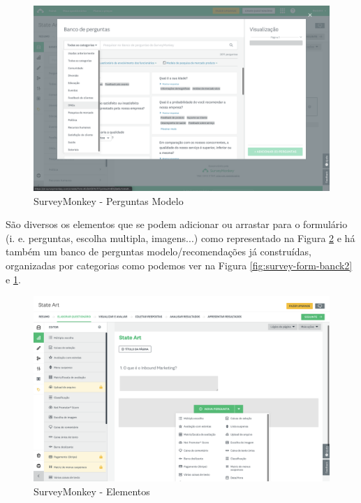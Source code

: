 \begin{figure}[ht!]
	\begin{center}
		\includegraphics[width=1\textwidth]{img/sm/survey-form-bank1}
		\caption{SurveyMonkey - Perguntas Modelo }
		\label{fig:survey-form-banck1}
	\end{center}
\end{figure}

\newpage

São diversos os elementos que se podem adicionar ou arrastar para o formulário (i. e. perguntas, escolha multipla, imagens...) como representado na Figura \ref{fig:surveymonkey-form-element} e há também um banco de perguntas modelo/recomendações já construídas, organizadas por categorias como podemos ver na Figura \ref{fig:survey-form-banck2} e \ref{fig:survey-form-banck1}.


\begin{figure}[ht!]
	\begin{center}
		\includegraphics[width=1\textwidth]{img/sm/surveymonkey-form-element}
		\caption{SurveyMonkey - Elementos }
		\label{fig:surveymonkey-form-element}
	\end{center}
\end{figure}
\newpage

